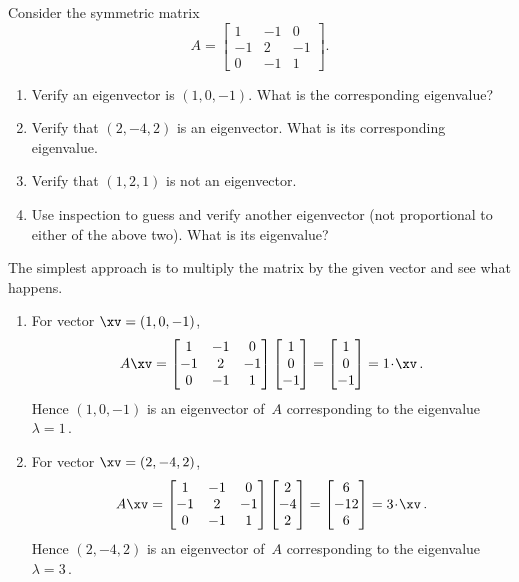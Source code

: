 \begin{example} \label{eg:eig3intro}
Consider the symmetric matrix
\begin{equation*}
A=\begin{bmatrix} 1&-1&0\\-1&2&-1\\0&-1&1 \end{bmatrix}.
\end{equation*}
\begin{enumerate}
\item Verify an eigenvector is \((1,0,-1)\).  
What is the corresponding eigenvalue?
\item Verify that \((2,-4,2)\) is an eigenvector.  
What is its corresponding eigenvalue.
\item Verify that \((1,2,1)\) is not an eigenvector.
\item Use inspection to guess and verify another eigenvector (not proportional to either of the above two).  
What is its eigenvalue?
\end{enumerate}
\begin{solution} 
The simplest approach is to multiply the matrix by the given vector and see what happens.
\begin{enumerate}
\item For vector \(\xv=(1,0,-1)\),
\begin{equation*}
A\xv=\begin{bmatrix} 1&-1&0\\-1&2&-1\\0&-1&1 \end{bmatrix}
\begin{bmatrix} 1\\0\\-1 \end{bmatrix}
=\begin{bmatrix} 1\\0\\-1  \end{bmatrix}
=1\cdot\xv\,.
\end{equation*}
Hence \((1,0,-1)\) is an eigenvector of~\(A\) corresponding to the eigenvalue \(\lambda=1\)\,.

\item For vector \(\xv=(2,-4,2)\),
\begin{equation*}
A\xv=\begin{bmatrix} 1&-1&0\\-1&2&-1\\0&-1&1 \end{bmatrix}
\begin{bmatrix} 2\\-4\\2 \end{bmatrix}
=\begin{bmatrix} 6\\-12\\6  \end{bmatrix}
=3\cdot\xv\,.
\end{equation*}
Hence \((2,-4,2)\) is an eigenvector of~\(A\) corresponding to the eigenvalue \(\lambda=3\)\,.
 

\end{enumerate}
\end{solution}
\end{example}
